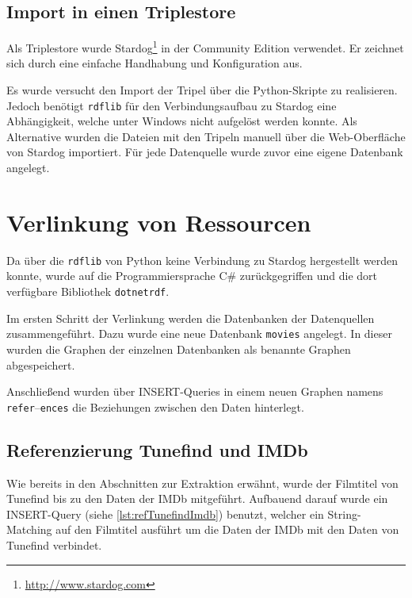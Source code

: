 \documentclass[parskip]{scrartcl}
\begin{document}
\subsection{Import in einen Triplestore}
Als Triplestore wurde Stardog\footnote{\url{http://www.stardog.com}} in der Community Edition verwendet. Er zeichnet sich durch eine einfache Handhabung und Konfiguration aus.

Es wurde versucht den Import der Tripel über die Python-Skripte zu realisieren. Jedoch benötigt \texttt{rdflib} für den Verbindungsaufbau zu Stardog eine Abhängigkeit, welche unter Windows nicht aufgelöst werden konnte. Als Alternative wurden die Dateien mit den Tripeln manuell über die Web-Oberfläche von Stardog importiert. Für jede Datenquelle wurde zuvor eine eigene Datenbank angelegt.

\section{Verlinkung von Ressourcen}

Da über die \texttt{rdflib} von Python keine Verbindung zu Stardog hergestellt werden konnte, wurde auf die Programmiersprache C\# zurückgegriffen und die dort verfügbare Bibliothek \texttt{dotnetrdf}.

Im ersten Schritt der Verlinkung werden die Datenbanken der Datenquellen zusammengeführt. Dazu wurde eine neue Datenbank \texttt{movies} angelegt. In dieser wurden die Graphen der einzelnen Datenbanken als benannte Graphen abgespeichert.

Anschließend wurden über INSERT-Queries in einem neuen Graphen namens \texttt{refer}--\texttt{ences} die Beziehungen zwischen den Daten hinterlegt.

\subsection{Referenzierung Tunefind und IMDb}
\label{subsec:refTunefindImdb}
Wie bereits in den Abschnitten zur Extraktion erwähnt, wurde der Filmtitel von Tunefind bis zu den Daten der IMDb mitgeführt. Aufbauend darauf wurde ein INSERT-Query (siehe \autoref{lst:refTunefindImdb}) benutzt, welcher ein String-Matching auf den Filmtitel ausführt um die Daten der IMDb mit den Daten von Tunefind verbindet. 
\end{document}
